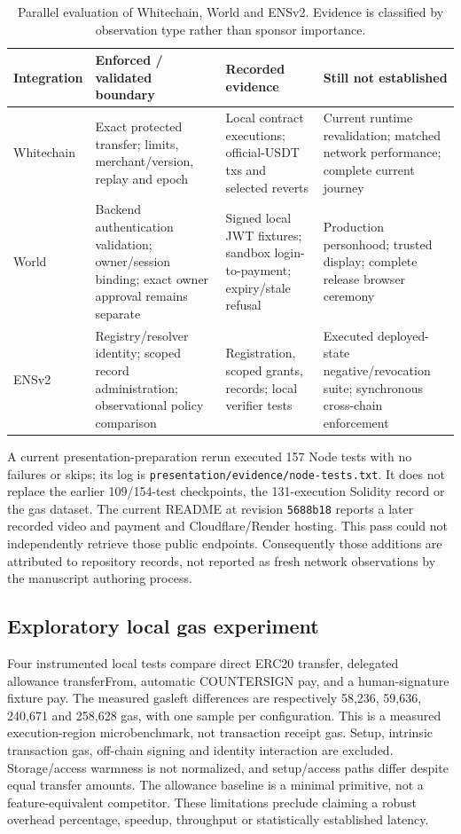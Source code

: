 \documentclass[11pt]{article}
\newcommand{\code}[1]{\nolinkurl{#1}}
\begin{document}
\begin{table}[htbp]\centering\small
\begin{tabular}{p{.16\linewidth}p{.27\linewidth}p{.25\linewidth}p{.22\linewidth}}\toprule
Integration & Enforced / validated boundary & Recorded evidence & Still not established\\\midrule
Whitechain & Exact protected transfer; limits, merchant/version, replay and epoch & Local contract executions; official-USDT txs and selected reverts & Current runtime revalidation; matched network performance; complete current journey\\
World & Backend authentication validation; owner/session binding; exact owner approval remains separate & Signed local JWT fixtures; sandbox login-to-payment; expiry/stale refusal & Production personhood; trusted display; complete release browser ceremony\\
ENSv2 & Registry/resolver identity; scoped record administration; observational policy comparison & Registration, scoped grants, records; local verifier tests & Executed deployed-state negative/revocation suite; synchronous cross-chain enforcement\\\bottomrule
\end{tabular}
\caption{Parallel evaluation of Whitechain, World and ENSv2. Evidence is classified by observation type rather than sponsor importance.}\label{tab:three-integrations}
\end{table}

A current presentation-preparation rerun executed 157 Node tests with no failures or skips; its log is \code{presentation/evidence/node-tests.txt}. It does not replace the earlier 109/154-test checkpoints, the 131-execution Solidity record or the gas dataset. The current README at revision \code{5688b18} reports a later recorded video and payment and Cloudflare/Render hosting. This pass could not independently retrieve those public endpoints. Consequently those additions are attributed to repository records, not reported as fresh network observations by the manuscript authoring process.

\subsection{Exploratory local gas experiment}
Four instrumented local tests compare direct ERC20 transfer, delegated allowance transferFrom, automatic COUNTERSIGN pay, and a human-signature fixture pay. The measured gasleft differences are respectively 58,236, 59,636, 240,671 and 258,628 gas, with one sample per configuration. This is a measured execution-region microbenchmark, not transaction receipt gas. Setup, intrinsic transaction gas, off-chain signing and identity interaction are excluded. Storage/access warmness is not normalized, and setup/access paths differ despite equal transfer amounts. The allowance baseline is a minimal primitive, not a feature-equivalent competitor. These limitations preclude claiming a robust overhead percentage, speedup, throughput or statistically established latency.
\end{document}
